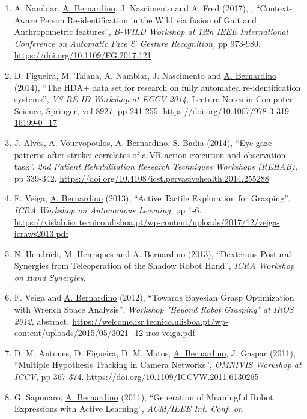 \documentclass[
]{article}
\begin{document}
\begin{enumerate}
  of joint compliance in quadrupedal locomotion'', \emph{International
  Symposium on Adaptive Motion of Animals and Machines (AMAM),} pp 1-2.
  \url{https://infoscience.epfl.ch/record/253019?ln=en}
\item
  A. Nambiar, \ul{A. Bernardino}, J. Nascimento and A. Fred (2017), ,
  ``Context-Aware Person Re-identification in the Wild via fusion of
  Gait and Anthropometric features'', \emph{B-WILD Workshop at 12th IEEE
  International Conference on Automatic Face \& Gesture Recognition,} pp
  973-980. \url{https://doi.org/10.1109/FG.2017.121}~
\item
  D. Figueira, M. Taiana, A. Nambiar, J. Nascimento and \ul{A.
  Bernardino} (2014), ``The HDA+ data set for research on fully
  automated re-identification systems'', \emph{VS-RE-ID Workshop at ECCV
  2014,} Lecture Notes in Computer Science, Springer, vol 8927, pp
  241-255. \url{https://doi.org/10.1007/978-3-319-16199-0_17}~
\item
  J. Alves, A. Vourvopoulos, \ul{A. Bernardino}, S. Badia (2014), ``Eye
  gaze patterns after stroke: correlates of a VR action execution and
  observation task''. \emph{2nd Patient Rehabilitation Research
  Techniques Workshops (REHAB),} pp 339-342.
  \url{https://doi.org/10.4108/icst.pervasivehealth.2014.255288}~
\item
  F. Veiga, \ul{A. Bernardino} (2013), ``Active Tactile Exploration for
  Grasping'', \emph{ICRA Workshop on Autonomous Learning,} pp 1-6.
  \url{https://vislab.isr.tecnico.ulisboa.pt/wp-content/uploads/2017/12/veiga-icraws2013.pdf}~
\item
  N. Hendrich, M. Henriques and \ul{A. Bernardino} (2013), ``Dexterous
  Postural Synergies from Teleoperation of the Shadow Robot Hand'',
  \emph{ICRA Workshop on Hand Synergies}.
\item
  F. Veiga and \ul{A. Bernardino} (2012), ``Towards Bayesian Grasp
  Optimization with Wrench Space Analysis'', \emph{Workshop "Beyond
  Robot Grasping" at IROS 2012,} abstract\emph{.}
  \url{https://welcome.isr.tecnico.ulisboa.pt/wp-content/uploads/2015/05/3021_12-iros-veiga.pdf}~
\item
  D. M. Antunes, D. Figueira, D. M. Matos, \ul{A. Bernardino}, J. Gaspar
  (2011), ``Multiple Hypothesis Tracking in Camera Networks'',
  \emph{OMNIVIS Workshop at ICCV,} pp 367-374.
  \url{https://doi.org/10.1109/ICCVW.2011.6130265}~
\item
  G. Saponaro, \ul{A. Bernardino} (2011), ``Generation of Meaningful
  Robot Expressions with Active Learning'', \emph{ACM/IEEE Int. Conf. on
}
\end{enumerate}
\end{document}
